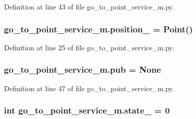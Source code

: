 Definition at line 43 of file go\+\_\+to\+\_\+point\+\_\+service\+\_\+m.\+py.

\subsubsection[{\texorpdfstring{position\+\_\+}{position_}}]{\setlength{\rightskip}{0pt plus 5cm}go\+\_\+to\+\_\+point\+\_\+service\+\_\+m.\+position\+\_\+ = Point()}\hypertarget{namespacego__to__point__service__m_abb95705acc8e0b8a82a6fc5d6243bdd8}{}\label{namespacego__to__point__service__m_abb95705acc8e0b8a82a6fc5d6243bdd8}


Definition at line 25 of file go\+\_\+to\+\_\+point\+\_\+service\+\_\+m.\+py.

\subsubsection[{\texorpdfstring{pub}{pub}}]{\setlength{\rightskip}{0pt plus 5cm}go\+\_\+to\+\_\+point\+\_\+service\+\_\+m.\+pub = None}\hypertarget{namespacego__to__point__service__m_ab9ea0cd28ffda51b5d6f1a436464f861}{}\label{namespacego__to__point__service__m_ab9ea0cd28ffda51b5d6f1a436464f861}


Definition at line 47 of file go\+\_\+to\+\_\+point\+\_\+service\+\_\+m.\+py.

\subsubsection[{\texorpdfstring{state\+\_\+}{state_}}]{\setlength{\rightskip}{0pt plus 5cm}int go\+\_\+to\+\_\+point\+\_\+service\+\_\+m.\+state\+\_\+ = 0}\hypertarget{namespacego__to__point__service__m_a840bab237e425d4f242bf69afe92f767}{}\label{namespacego__to__point__service__m_a840bab237e425d4f242bf69afe92f767}


